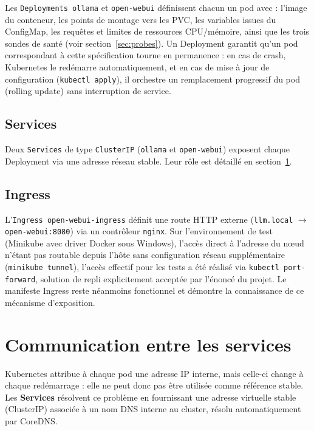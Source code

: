 ﻿\documentclass[11pt,a4paper]{article}
\begin{document}
Les \texttt{Deployments ollama} et \texttt{open-webui} définissent chacun un pod avec : l'image du conteneur, les points de montage vers les PVC, les variables issues du ConfigMap, les requêtes et limites de ressources CPU/mémoire, ainsi que les trois sondes de santé (voir section~\ref{sec:probes}). Un Deployment garantit qu'un pod correspondant à cette spécification tourne en permanence : en cas de crash, Kubernetes le redémarre automatiquement, et en cas de mise à jour de configuration (\texttt{kubectl apply}), il orchestre un remplacement progressif du pod (rolling update) sans interruption de service.

\subsection{Services}

Deux \texttt{Services} de type \texttt{ClusterIP} (\texttt{ollama} et \texttt{open-webui}) exposent chaque Deployment via une adresse réseau stable. Leur rôle est détaillé en section~\ref{sec:communication}.

\subsection{Ingress}

L'\texttt{Ingress open-webui-ingress} définit une route HTTP externe (\texttt{llm.local} $\rightarrow$ \texttt{open-webui:8080}) via un contrôleur \texttt{nginx}. Sur l'environnement de test (Minikube avec driver Docker sous Windows), l'accès direct à l'adresse du nœud n'étant pas routable depuis l'hôte sans configuration réseau supplémentaire (\texttt{minikube tunnel}), l'accès effectif pour les tests a été réalisé via \texttt{kubectl port-forward}, solution de repli explicitement acceptée par l'énoncé du projet. Le manifeste Ingress reste néanmoins fonctionnel et démontre la connaissance de ce mécanisme d'exposition.

\section{Communication entre les services}
\label{sec:communication}

Kubernetes attribue à chaque pod une adresse IP interne, mais celle-ci change à chaque redémarrage : elle ne peut donc pas être utilisée comme référence stable. Les \textbf{Services} résolvent ce problème en fournissant une adresse virtuelle stable (ClusterIP) associée à un nom DNS interne au cluster, résolu automatiquement par CoreDNS.
\end{document}
